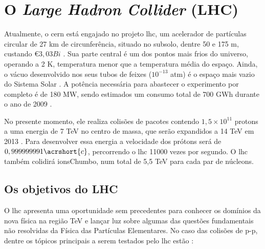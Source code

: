 \section{O \emph{Large Hadron Collider} (LHC)}
\label{sec:lhc}


Atualmente, o \gls{cern} está engajado no projeto \gls{lhc}, 
um acelerador de partículas circular de 27 km de
circunferência, situado no subsolo, dentre 50 e 175 m, custando \euro $3,03
Bi$ \cite{webLHC}. Sua parte central é um dos pontos mais frios do universo,
operando a 2 K, temperatura menor que a temperatura média do espaço. Ainda, o
vácuo desenvolvido nos seus tubos de feixes ($10^{-13}$ atm) é o espaço mais vazio do Sistema
Solar \cite{closerLook}. A potência necessária para abastecer o experimento por
completo é de 180 MW, sendo estimados um consumo total de 700 GWh durante o
ano de 2009 \cite{webLHC}. 

No presente momento, ele realiza colisões de pacotes contendo $1,5\times10^{11}$ \gls{protons} 
a uma energia de 7 TeV no centro de massa, que serão expandidos a 14 TeV em 2013
\cite{webATLAS}. Para desenvolver essa energia a velocidade dos prótons será de 
$0,999999991\acrshort{c}$, percorrendo o \gls{lhc} 11000 vezes por segundo.
O \gls{lhc} também colidirá \gls{ionsChumbo}, num total de 5,5 TeV para cada par
de núcleons.

\subsection{Os objetivos do LHC}
\label{ssec:obj_lhc}

O \gls{lhc} apresenta uma oportunidade sem precedentes para conhecer os domínios da
nova física na região TeV e lançar luz sobre algumas das questões fundamentais
não resolvidas da Física das Partículas Elementares.
No caso das colisões de p-p, dentre os tópicos principais a serem testados pelo
\gls{lhc} estão \cite{hunt_for_physics}:


